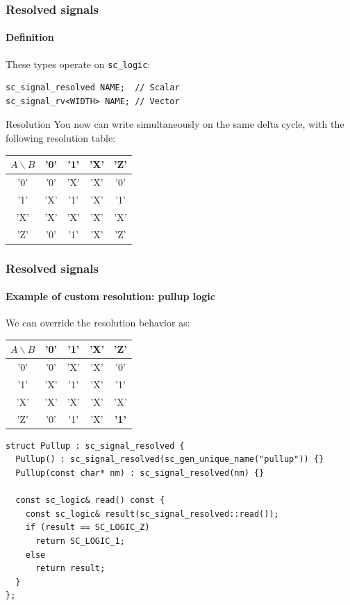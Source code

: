 \begin{frame}[fragile]
\frametitle{Resolved signals}
\framesubtitle{Definition}

\begin{block}{These types operate on \texttt{sc\_logic}:}
\vspace{-1em}
\begin{verbatim}
sc_signal_resolved NAME;  // Scalar
sc_signal_rv<WIDTH> NAME; // Vector
\end{verbatim}
\vspace{-1em}
\end{block}
\pause
\begin{block}{Resolution}
You now can write simultaneously on the same delta cycle, with the following resolution table:

\begin{table}
\begin{tabular}{c|cccc}
\hline
$A\backslash B$ & '0' & '1' & 'X' & 'Z' \\
\hline
'0' & '0' & 'X' & 'X' & '0' \\
'1' & 'X' & '1' & 'X' & '1' \\
'X' & 'X' & 'X' & 'X' & 'X' \\
'Z' & '0' & '1' & 'X' & 'Z'
\end{tabular}
\end{table}
\end{block}
\end{frame}

\begin{frame}[fragile]
\frametitle{Resolved signals}
\framesubtitle{Example of custom resolution: pullup logic}

\begin{block}{We can override the resolution behavior as:}
\vspace{-0.5em}
\begin{table}
\begin{tabular}{c|cccc}
\hline
$A\backslash B$ & '0' & '1' & 'X' & 'Z' \\
\hline
'0' & '0' & 'X' & 'X' & '0' \\
'1' & 'X' & '1' & 'X' & '1' \\
'X' & 'X' & 'X' & 'X' & 'X' \\
'Z' & '0' & '1' & 'X' & {\bfseries '1'}
\end{tabular}
\end{table}
\vspace{-1em}
\end{block}

{\scriptsize 
\begin{verbatim}
struct Pullup : sc_signal_resolved {
  Pullup() : sc_signal_resolved(sc_gen_unique_name("pullup")) {}
  Pullup(const char* nm) : sc_signal_resolved(nm) {}
  
  const sc_logic& read() const {
    const sc_logic& result(sc_signal_resolved::read());
    if (result == SC_LOGIC_Z) 
      return SC_LOGIC_1;
    else
      return result;
  }
};
\end{verbatim}
}
\end{frame}
